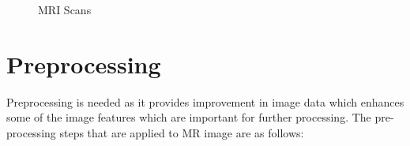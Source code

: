 \documentclass[10pt]{report}
\begin{document}
	\begin{figure}[H]
		\centering
		\hspace{0.5cm}
		\caption{MRI Scans}
		\label{MRIScans}
	\end{figure}

	\section{Preprocessing}%

	Preprocessing is needed as it provides improvement
	in image data which  enhances some of the image features which are important
	for further processing. The  pre-processing steps that are applied to MR
	image are as follows:
\end{document}
